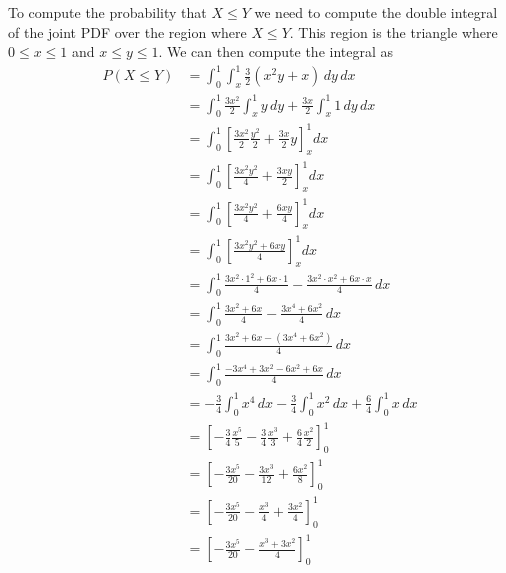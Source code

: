 To compute the probability that $X \leq Y$ we need to compute the double integral of the joint PDF over the region where $X \leq Y$. This region is the triangle where $0 \leq x \leq 1$ and $x \leq y \leq 1$. We can then compute the integral as
\begin{align*}
	P(X\leq Y) & = \int_{0}^{1}\int_{x}^{1} \frac{3}{2}(x^2y + x)\, dy\, dx                                          \\
	           & = \int_{0}^{1} \frac{3x^2}{2} \int_{x}^{1}y\, dy + \frac{3x}{2} \int_{x}^{1}1\, dy\, dx             \\
	           & = \int_{0}^{1} \left[\frac{3x^2}{2} \frac{y^2}{2} + \frac{3x}{2} y\right]^1_x dx                    \\
	           & = \int_{0}^{1} \left[\frac{3x^2y^2}{4} + \frac{3xy}{2}\right]^1_x dx                                \\
	           & = \int_{0}^{1} \left[\frac{3x^2y^2}{4} + \frac{6xy}{4}\right]^1_x dx                                \\
	           & = \int_{0}^{1} \left[\frac{3x^2y^2+6xy}{4}\right]^1_x dx                                            \\
	           & = \int_{0}^{1} \frac{3x^2\cdot 1^2+6x\cdot 1}{4} -  \frac{3x^2\cdot x^2+6x\cdot x}{4}\,dx           \\
	           & = \int_{0}^{1} \frac{3x^2+6x}{4} -  \frac{3x^4+6x^2}{4}\,dx                                         \\
	           & = \int_{0}^{1} \frac{3x^2+6x-(3x^4+6x^2)}{4}\,dx                                                    \\
	           & = \int_{0}^{1} \frac{-3x^4+3x^2-6x^2+6x}{4}\,dx                                                     \\
	           & =  -\frac{3}{4}\int_{0}^{1}x^4\, dx-\frac{3}{4}\int_{0}^{1}x^2\, dx + \frac{6}{4}\int_{0}^{1}x\, dx \\
	           & =  \left[-\frac{3}{4}\frac{x^5}{5}-\frac{3}{4}\frac{x^3}{3} + \frac{6}{4}\frac{x^2}{2}\right]_0^1   \\
	           & =  \left[-\frac{3x^5}{20}-\frac{3x^3}{12} + \frac{6x^2}{8}\right]_0^1                               \\
	           & =  \left[-\frac{3x^5}{20}-\frac{x^3}{4} + \frac{3x^2}{4}\right]_0^1                                 \\
	           & =  \left[-\frac{3x^5}{20}-\frac{x^3+3x^2}{4}\right]_0^1                                             \\

\end{align*}

